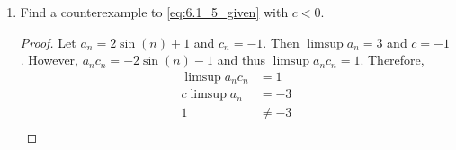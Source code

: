 \documentclass{article}
\begin{document}
\begin{enumerate}
\begin{enumerate}
\begin{proof}
\begin{align*}
                                           & = c\bar s_a + \frac{\varepsilon}{2} + \frac{\varepsilon}{2}^2                                                                          \\
                                    c_na_n & \leq c\bar s_a + \varepsilon
                              \end{align*}
                              and there exists some $n_o>N$ so that
                              \begin{align*}
                                    c_{n_o}a_{n_o} & \geq \left(c - \varepsilon'\right)\left(\bar s_a - \varepsilon'\right)                                                                 \\
                                                   & = c\bar s_a - \left(c+\bar s_a\right)\varepsilon' + \varepsilon'^2                                                                     \\
                                                   & = c\bar s_a - \left(c+\bar s_a\right)\frac{\varepsilon}{2\left(\bar s_a + c\right)} + \frac{\varepsilon}{2\left(\bar s_a + c\right)}^2 \\
                                                   & = c\bar s_a - \frac{\varepsilon}{2} + \frac{\varepsilon}{2}^2                                                                          \\
                                    c_{n_o}a_{n_o} & \geq c\bar s_a - \varepsilon
                              \end{align*}
                              Therefore, $\limsup c_na_n = c\bar s_a = c\limsup a_n$.
                        \end{proof}
                  \item Find a counterexample to \eqref{eq:6.1_5_given}
                        with $c<0$.
                        \begin{proof}
                              Let $a_n=2\sin(n)+1$ and $c_n=-1$. Then $\limsup a_n=3$
                              and $c=-1$. However, $a_nc_n=-2\sin(n)-1$ and thus
                              $\limsup a_nc_n=1$. Therefore,
                              \begin{align*}
                                    \limsup a_nc_n & = 1               \\
                                    c\limsup a_n   & = -3              \\
                                    1              & \neq -3           \\

\end{align*}
\end{proof}
\end{enumerate}
\end{enumerate}
\end{document}
